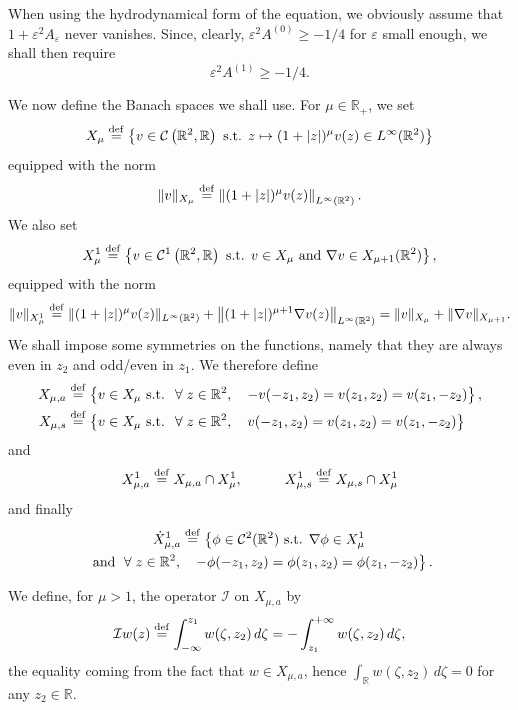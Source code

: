 \documentclass[AHL,Unicode,longabstracts,published]{cedram}
\newcommand*\R{\mathbb R}
\newcommand*\ddef{\stackrel{\rm def}{=}}
\newcommand*\BC{\mathcal{C}}
\newcommand*\BI{\mathcal{I}}
\newcommand*\ii{\infty}
\newcommand*\gs{\geqslant }
\newcommand*\e{\varepsilon}
\let\oldforall\forall
\renewcommand*{\forall}{\mathrel{\oldforall}}
\begin{document}
When using the hydrodynamical form of the equation, we obviously assume that $ 1 + \e^2 A_\e $ never vanishes. Since, clearly, $ \e^2 A^{(0)} \gs -1/4 $ for $ \e $ small enough, we shall then require
\begin{equation}\label{farwest}
\e^2 A^{(1)} \gs - 1/4.
\end{equation}


We now define the Banach spaces we shall use. For $ \mu \in \R_+ $, we set
\[
X_{\mu } \ddef \left\{ v \in \BC \left(\R^2, \R\right) \text{ s.t. } z \mapsto (1 + |z|)^\mu v(z) \in L^\ii (\R^2) \right\}
\]
equipped with the norm
\[
\| v \|_{X_\mu} \ddef \left\| (1 + |z|)^\mu v(z) \right\|_{ L^\ii (\R^2) }.
\]
We also set
\[
X^1_\mu \ddef \left\{ v \in \BC^1 \left(\R^2, \R\right) \text{ s.t. } v \in X_\mu \text{ and } \nabla v \in X_{\mu +1 } (\R^2) \right\},
\]
equipped with the norm
\[
\| v \|_{X^1_{\mu}} \ddef
\| (1 + |z|)^\mu v(z) \|_{ L^\ii (\R^2) } + \left\| (1 + |z|)^{\mu+1} \nabla v(z) \right\|_{ L^\ii (\R^2) } = \| v \|_{X_\mu} + \| \nabla v \|_{X_{ \mu +1}}.
\]
We shall impose some symmetries on the functions, namely that they are always even in $ z_2 $ and odd/even in $z_1$. We therefore define
\begin{align*}
X_{\mu, a} &\ddef \left\{ v \in X_\mu \text{ s.t. } \forall z \in \R^2, \quad - v(-z_1,z_2) = v(z_1, z_2) = v(z_1, - z_2) \right\},
\\
X_{\mu, s} &\ddef \left\{ v \in X_\mu \text{ s.t. } \forall z \in \R^2, \quad v(- z_1,z_2) = v(z_1, z_2) = v(z_1, - z_2) \right\}
\end{align*}
and
\[
X^1_{\mu, a} \ddef X_{\mu, a} \cap X^1_{\mu },
\quad \quad \quad X^1_{\mu, s} \ddef X_{\mu, s} \cap X^1_{\mu }
\]
and finally
\begin{multline*}
\dot{X}^1_{\mu, a } \ddef
\left\{ \phi \in \BC^2 (\R^2) \text{ s.t. } \nabla \phi \in X^1_\mu\right.
\\
\left.\text{ and }
\forall z \in \R^2, \quad - \phi (- z_1, z_2) = \phi (z_1, z_2) = \phi (z_1, - z_2)
\right\}.
\end{multline*}

We define, for $ \mu > 1 $, the operator $ \BI $ on $ X_{\mu,a} $ by
\begin{equation}\label{def_I}
\BI w (z)
\ddef \int_{-\ii}^{z_1} w (\zeta, z_2) \, d\zeta = - \int_{z_1}^{+\ii} w (\zeta, z_2) \, d\zeta,
\end{equation} the equality coming from the fact that $ w \in X_{\mu,a} $, hence $ \int_\R w (\zeta, z_2) \, d\zeta = 0 $ for any $ z_2 \in \R $.
\end{document}
